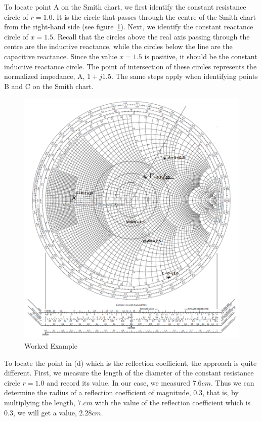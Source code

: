 \begin{exmp}
To locate point A on the Smith chart, we first identify the constant resistance circle of $r = 1.0$. It is the circle that passes through the centre of the Smith chart from the right-hand side (see figure~\ref{fig:workedexample1}). Next, we identify the constant reactance circle of $x = 1.5$. Recall that the circles above the real axis passing through the centre are the inductive reactance, while the circles below the line are the capacitive reactance. Since the value $x = 1.5$ is positive, it should be the constant inductive reactance circle. The point of intersection of these circles represents the normalized impedance, A, $1 + j1.5$. The same steps apply when identifying points B and C on the Smith chart.
\begin{figure}[h]
\centering
\includegraphics[width=1\linewidth]{"./graphics/Smith chart"}
\caption{Worked Example}
\label{fig:workedexample1}
\end{figure}

To locate the point in (d) which is the reflection coefficient, the approach is quite different. First, we measure the length of the diameter of the constant resistance circle $r = 1.0$ and record its value. In our case, we measured $7.6cm$. Thus we can determine the radius of a reflection coefficient of magnitude, $0.3$, that is, by multiplying the length, $7.cm$ with the value of the reflection coefficient which is $0.3$, we will get a value, $2.28cm$. 


\end{exmp}

